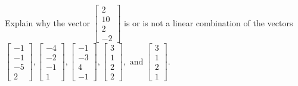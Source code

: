 \documentclass{article}
\begin{document}
\begin{exerciseStatement}
    Explain why the vector \(\left[\begin{array}{c}
2 \\
10 \\
2 \\
-2
\end{array}\right]\)  is or is not a linear
combination of the vectors \(\left[\begin{array}{c}
-1 \\
-1 \\
-5 \\
2
\end{array}\right] , \left[\begin{array}{c}
-4 \\
-2 \\
-1 \\
1
\end{array}\right] , \left[\begin{array}{c}
-1 \\
-3 \\
4 \\
-1
\end{array}\right] , \left[\begin{array}{c}
3 \\
1 \\
2 \\
2
\end{array}\right] , \text{ and } \left[\begin{array}{c}
3 \\
1 \\
2 \\
1
\end{array}\right]\).



  
\end{exerciseStatement}
\end{document}
